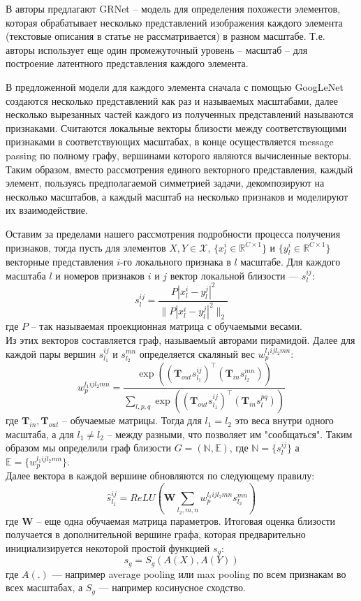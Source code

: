\documentclass[a4paper,12pt]{article}
\begin{document}
				В \cite{https://doi.org/10.48550/arXiv.1908.11754} авторы предлагают GRNet – модель для определения похожести элементов, которая обрабатывает несколько представлений изображения каждого элемента (текстовые описания в статье не рассматривается) в разном масштабе. Т.е. авторы использует еще один промежуточный уровень -- масштаб -- для построение латентного представления каждого элемента. 
				
				В предложенной модели для каждого элемента сначала с помощью GoogLeNet \cite{https://doi.org/10.48550/arXiv.1409.4842} создаются несколько представлений как раз и называемых масштабами, далее несколько вырезанных частей каждого из полученных представлений называются признаками. Считаются локальные векторы близости между соответствующими признаками в соответствующих масштабах, в конце осуществляется message passing \cite{https://doi.org/10.48550/arXiv.1704.01212} по полному графу, вершинами которого являются вычисленные векторы. Таким образом, вместо рассмотрения единого векторного представления, каждый элемент, пользуясь предполагаемой симметрией задачи, декомпозируют на несколько масштабов, а каждый масштаб на несколько признаков и моделируют их взаимодействие.
				
				Оставим за пределами нашего рассмотрения подробности процесса получения признаков, тогда пусть для элементов $X, Y\in \mathcal{X}$,  $\{x_l^i \in \mathbb{R}^{C\times 1}\}$ и $\{y_l^i \in \mathbb{R}^{C\times 1}\}$ векторные представления $i$-го локального признака в $l$ масштабе. Для каждого масштаба $l$ и номеров признаков $i$ и $j$ вектор локальной близости --- $s_l^{ij}$:
				$$s_l^{ij} = \frac{P|x_l^i-y_l^j|^2}{\|P|x_l^i-y_l^j|^2\|_2}$$
				где $P$ -- так называемая проекционная матрица с обучаемыми весами.\\
				Из этих векторов составляется граф, называемый авторами пирамидой. Далее для каждой пары вершин $s_{l_1}^{ij}$ и $s_{l_2}^{mn}$ определяется скаляный вес $w_p^{l_1ijl_2mn}$:
				$$w_p^{l_1ijl_2mn} = \frac{\exp((\mathbf{T}_{out}s_{l_1}^{ij})^\intercal(\mathbf{T}_{in}s_{l_2}^{mn}))}{\sum\limits_{l,p,q}\exp((\mathbf{T}_{out}s_{l_1}^{ij})^\intercal(\mathbf{T}_{in}s_{l}^{pq}))}$$ 
				где $\mathbf{T}_{in}, \mathbf{T}_{out}$ -- обучаемые матрицы.
				Тогда для $l_1=l_2$ это веса внутри одного масштаба, а для $l_1\neq l_2$ -- между разными, что позволяет им "сообщаться". Таким образом мы определили граф близости $G = (\mathbb{N},\mathbb{E})$, где $\mathbb{N} = \{s_l^{ij}\}$ а $\mathbb{E} = \{w_p^{l_1ijl_2mn}\}$.\\
				Далее вектора в каждой вершине обновляются по следующему правилу:
				$$\widehat{s}_{l_1}^{ij} =ReLU\left(\mathbf{W} \sum\limits_{l_2,m,n}w_p^{l_1ijl_2mn}s_{l_2}^{mn}\right)$$
				где $\mathbf{W}$ -- еще одна обучаемая матрица параметров. Итоговая оценка близости получается в дополнительной вершине графа, которая предварительно инициализируется некоторой простой функцией $s_g$:
				$$s_g = S_g(A(X), A(Y))$$
				где $A(.)$ --- например average pooling или max pooling по всем признакам во всех масштабах, а $S_g$ ---  например косинусное сходство.\\
				
\end{document}
